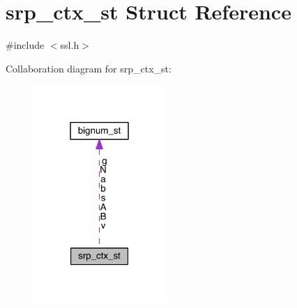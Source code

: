 \hypertarget{structsrp__ctx__st}{}\section{srp\+\_\+ctx\+\_\+st Struct Reference}
\label{structsrp__ctx__st}


{\ttfamily \#include $<$ssl.\+h$>$}



Collaboration diagram for srp\+\_\+ctx\+\_\+st\+:\nopagebreak
\begin{figure}[H]
\begin{center}
\leavevmode
\includegraphics[width=142pt]{structsrp__ctx__st__coll__graph}
\end{center}
\end{figure}
